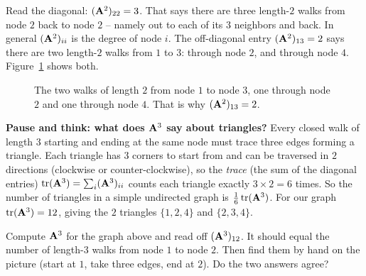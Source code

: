 Read the diagonal: $(\mathbf{A}^2)_{22} = 3$. That says there are three length-$2$ walks from
node $2$ back to node $2$ -- namely out to each of its $3$ neighbors and back. In general
$(\mathbf{A}^2)_{ii}$ is the degree of node $i$. The off-diagonal entry
$(\mathbf{A}^2)_{13} = 2$ says there are two length-$2$ walks from $1$ to $3$: through node
$2$, and through node $4$. Figure~\ref{ch35:fig-walks} shows both.

\begin{figure}[htbp]
\centering
{}
\caption{The two walks of length $2$ from node $1$ to node $3$, one through node $2$ and one
through node $4$. That is why $(\mathbf{A}^2)_{13} = 2$.}
\label{ch35:fig-walks}
\end{figure}

\begin{recoverybox}
\textbf{Pause and think: what does $\mathbf{A}^3$ say about triangles?}
Every closed walk of length $3$ starting and ending at the same node must trace three edges
forming a triangle. Each triangle has $3$ corners to start from and can be traversed in $2$
directions (clockwise or counter-clockwise), so the \emph{trace} (the sum of the diagonal
entries) $\operatorname{tr}(\mathbf{A}^3) = \sum_i (\mathbf{A}^3)_{ii}$ counts each triangle exactly
$3 \times 2 = 6$ times. So the number of triangles in a simple undirected graph is
$\tfrac{1}{6}\operatorname{tr}(\mathbf{A}^3)$. For our graph $\operatorname{tr}(\mathbf{A}^3) = 12$, giving the $2$ triangles
$\{1,2,4\}$ and $\{2,3,4\}$.
\end{recoverybox}

\begin{labbox}
Compute $\mathbf{A}^3$ for the graph above and read off $(\mathbf{A}^3)_{12}$. It should equal
the number of length-$3$ walks from node $1$ to node $2$. Then find them by hand on the
picture (start at $1$, take three edges, end at $2$). Do the two answers agree?
\end{labbox}


